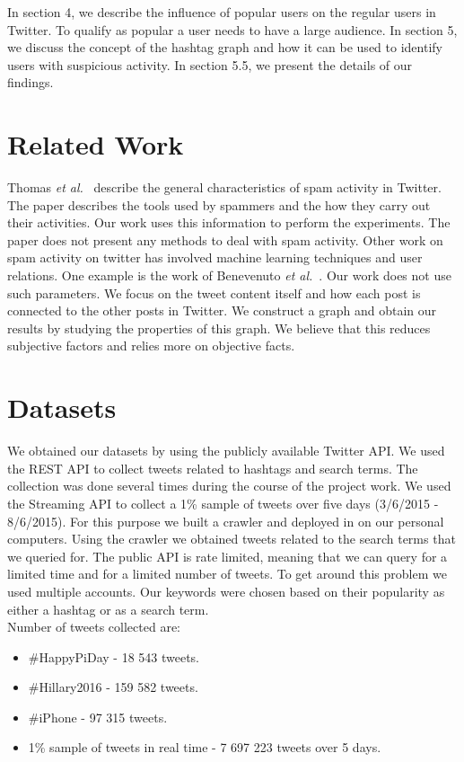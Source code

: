 \documentclass[journal, a4paper, 12pt]{article}
\begin{document}
In section 4, we describe the influence of popular users on the regular users in Twitter. To qualify as popular a user needs to have a large audience. In section 5, we discuss the concept of the hashtag graph and how it can be used to identify users with suspicious activity. In section 5.5, we present the details of our findings.


\section{Related Work}

Thomas \textit{et al.}~\cite{thomas_paper} describe the general characteristics of spam activity in Twitter. The paper describes the tools used by spammers and the how they carry out their activities. Our work uses this information to perform the experiments. The paper does not present any methods to deal with spam activity. Other work on spam activity on twitter has involved machine learning techniques and user relations. One example is the work of Benevenuto \textit{et al.}~\cite{benevenuto_paper}. Our work does not use such parameters. We focus on the tweet content itself and how each post is connected to the other posts in Twitter. We construct a graph and obtain our results by studying the properties of this graph. We believe that this reduces subjective factors and relies more on objective facts.  

\section{Datasets}

We obtained our datasets by using the publicly available Twitter API. We used the REST API to collect tweets related to hashtags and search terms. The collection was done several times during the course of the project work. We used the Streaming API to collect a 1\% sample of tweets over five days (3/6/2015 - 8/6/2015). For this purpose we built a crawler and deployed in on our personal computers. Using the crawler we obtained tweets related to the search terms that we queried for. The public API is rate limited, meaning that we can query for a limited time and for a limited number of tweets. To get around this problem we used multiple accounts. Our keywords were chosen based on their popularity as either a hashtag or as a search term. \\

Number of tweets collected are:
\begin{itemize}
\item \#HappyPiDay - 18 543 tweets.
\item \#Hillary2016 - 159 582 tweets.
\item \#iPhone - 97 315 tweets.
\item 1\% sample of tweets in real time - 7 697 223 tweets over 5 days.
\end{itemize}
\end{document}
